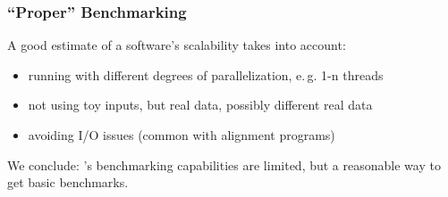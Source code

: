 \begin{frame}
	\frametitle{``Proper'' Benchmarking}
	A good estimate of a software's scalability takes into account:
	\begin{itemize}[<+->]
		\item running with different degrees of parallelization, e.\,g. 1-n threads
		\item not using toy inputs, but real data, possibly different real data
		\item avoiding I/O issues (common with alignment programs)
	\end{itemize}
	\pause
	\begin{warning}
		We conclude: \Snakemake's benchmarking capabilities are limited, but a reasonable way to get basic benchmarks.
	\end{warning}
\end{frame}
